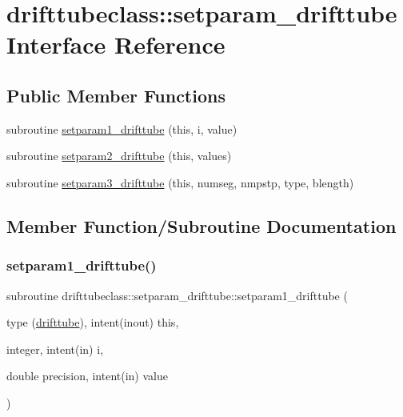 \hypertarget{interfacedrifttubeclass_1_1setparam__drifttube}{}\section{drifttubeclass\+::setparam\+\_\+drifttube Interface Reference}
\label{interfacedrifttubeclass_1_1setparam__drifttube}
\subsection*{Public Member Functions}
\begin{DoxyCompactItemize}
\item 
subroutine \mbox{\hyperlink{interfacedrifttubeclass_1_1setparam__drifttube_ae7ae9af289cffe0388c97f9a02915070}{setparam1\+\_\+drifttube}} (this, i, value)
\item 
subroutine \mbox{\hyperlink{interfacedrifttubeclass_1_1setparam__drifttube_ad486c914db6dae5a0b5f50849f581945}{setparam2\+\_\+drifttube}} (this, values)
\item 
subroutine \mbox{\hyperlink{interfacedrifttubeclass_1_1setparam__drifttube_ace2b0784fb4c5e2de4ea96ef3f9a4d95}{setparam3\+\_\+drifttube}} (this, numseg, nmpstp, type, blength)
\end{DoxyCompactItemize}


\subsection{Member Function/\+Subroutine Documentation}
\mbox{\label{interfacedrifttubeclass_1_1setparam__drifttube_ae7ae9af289cffe0388c97f9a02915070}} 
\subsubsection{\texorpdfstring{setparam1\_drifttube()}{setparam1\_drifttube()}}
{\footnotesize\ttfamily subroutine drifttubeclass\+::setparam\+\_\+drifttube\+::setparam1\+\_\+drifttube (\begin{DoxyParamCaption}\item[{type (\mbox{\hyperlink{namespacedrifttubeclass_structdrifttubeclass_1_1drifttube}{drifttube}}), intent(inout)}]{this,  }\item[{integer, intent(in)}]{i,  }\item[{double precision, intent(in)}]{value }\end{DoxyParamCaption})}

